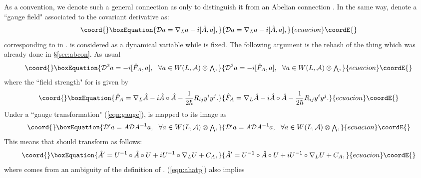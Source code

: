 \documentclass[10pt,a4paper]{article}
\def\h{\hbar}
\def\hA{{\hat A}}
\begin{document}
As a convention, we denote such a general connection as \coordHE{} only to distinguish it from an Abelian connection \coordHE{}. In the same way, denote a ``gauge field" \myHighlight{$\hA$}\coordHE{} associated to the covariant derivative \coordHE{} as:
\begin{equation}\coord{}\boxEquation{
\label{eqn:ahat}
{\cal D}a=\nabla_La-i[\hA,a],
}{
{\cal D}a=\nabla_La-i[\hA,a],
}{ecuacion}\coordE{}\end{equation}
corresponding to \coordHE{} in \coordHE{}. \myHighlight{$\hA$}\coordHE{} is considered as a dynamical variable while \coordHE{} is fixed. The following argument is the rehash of the thing which was already done in \S\ref{sec:abcon}. As usual 
\begin{equation}\coord{}\boxEquation{
{\cal D}^2a=-i[{\hat F}_A,a],\ \ \forall a\in W(L,{\cal A})\otimes {\scriptstyle \bigwedge},
}{
{\cal D}^2a=-i[{\hat F}_A,a],\ \ \forall a\in W(L,{\cal A})\otimes {\scriptstyle \bigwedge},
}{ecuacion}\coordE{}\end{equation}
where the ``field strength" \coordHE{} for \myHighlight{$\hA$}\coordHE{} is given by
\begin{equation}\coord{}\boxEquation{
\label{eqn:fhata}
{\hat F}_A=\nabla_L\hA-i\hA\circ\hA-{1\over2\h}R_{ij}y^iy^j.
}{
{\hat F}_A=\nabla_L\hA-i\hA\circ\hA-{1\over2\h}R_{ij}y^iy^j.
}{ecuacion}\coordE{}\end{equation}
Under a ``gauge transformation" \coordHE{} (\ref{eqn:gauge}), \coordHE{} is mapped to its image as
\begin{equation}\coord{}\boxEquation{
\label{eqn:caldp}
{\cal D}'a=A{\cal D}A^{-1}a,\ \ \forall a\in W(L,{\cal A})\otimes {\scriptstyle \bigwedge},
}{
{\cal D}'a=A{\cal D}A^{-1}a,\ \ \forall a\in W(L,{\cal A})\otimes {\scriptstyle \bigwedge},
}{ecuacion}\coordE{}\end{equation}
This means that \myHighlight{$\hA$}\coordHE{} should transform as follows:
\begin{equation}\coord{}\boxEquation{
\label{eqn:ahatp}
\hA'=U^{-1}\circ \hA\circ U+iU^{-1}\circ \nabla_L U+C_A,
}{
\hA'=U^{-1}\circ \hA\circ U+iU^{-1}\circ \nabla_L U+C_A,
}{ecuacion}\coordE{}\end{equation}
where \coordHE{} comes from an ambiguity of the definition of \myHighlight{$\hA$}\coordHE{}. (\ref{eqn:ahatp}) also implies
\end{document}
